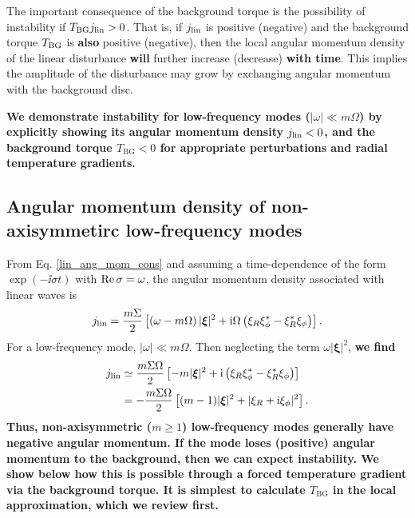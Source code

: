 The important consequence of the background torque is the possibility
of instability if $T_\mathrm{BG}j_\mathrm{lin}>0$. That is, if $j_\mathrm{lin}$ is positive
(negative) and the background torque $T_\mathrm{BG}$ is {\bf also} positive (negative),
then the local angular momentum density of the linear disturbance
{\bf will} further increase (decrease) {\bf with time}. This implies the amplitude of the disturbance
may grow by exchanging angular momentum with the background
disc.%

{\bf 
  We demonstrate instability for low-frequency modes 
  ($|\omega|\ll m\Omega$) by explicitly showing its 
  angular momentum density 
  $j_\mathrm{lin}<0$, and the background torque $T_\mathrm{BG}<0$ for
  appropriate perturbations and radial temperature gradients. 
}

\subsection{Angular momentum density of  non-axisymmetirc low-frequency modes}
From Eq. \ref{lin_ang_mom_cons} and assuming a time-dependence of the
form $\exp{(-\ii \sigma t)}$ with $\operatorname{Re}{\sigma} = \omega$,  
the angular momentum density associated with linear waves is
\begin{align}
  j_\mathrm{lin} = \frac{m\Sigma}{2}\left[\left(\omega -
      m\Omega\right)|\bm{\xi}|^2 + \mathrm{i}\Omega\left(\xi_R\xi_\phi^* -
      \xi_R^*\xi_\phi\right)\right].\label{ang_mom_def}  
\end{align}
For a low-frequency mode, $|\omega|\ll m\Omega$. Then neglecting the
term $\omega|\bm{\xi}|^2$, {\bf we find}
\begin{align}
  j_\mathrm{lin} &\simeq \frac{m\Sigma\Omega}{2}\left[-m|\bm{\xi}|^2 + \mathrm{i}\left(\xi_R\xi_\phi^* -
      \xi_R^*\xi_\phi\right)\right]\notag\\
  & = -\frac{m\Sigma\Omega}{2}\left[ (m-1)|\bm{\xi}|^2 +  |\xi_R + \mathrm{i}\xi_\phi|^2\right].
\end{align}
{\bf
Thus, non-axisymmetric ($m\geq1$) low-frequency modes generally have 
negative angular momentum. If the mode loses (positive) angular momentum 
to the background, then we can expect instability. We show 
below how this is possible through a forced temperature
gradient via the background torque. It is simplest to calculate
$T_\mathrm{BG}$ in the local approximation, which we review first.  
}

